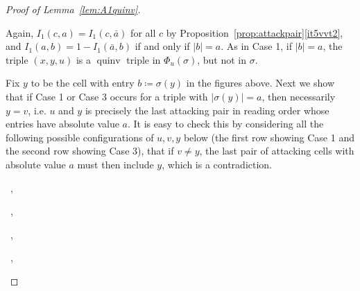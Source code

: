 \documentclass[11pt]{article}
\theoremstyle{definition}
\numberwithin{equation}{section}
\DeclareMathOperator{\quinv}{quinv}
\newcommand\cellL[4]{
\def\i{#1} \def\j{#2} \def\entry{#3} \def\labl{#4}
\draw (\j-1,-\i)--(\j,-\i)--(\j,-\i+1)--(\j-1,-\i+1)--(\j-1,-\i);
\node at (\j-.5,-\i+.5) {\entry};
\node at (\j-1.3,-\i+.8) {\tiny\labl};
}
\begin{document}
\begin{proof}[Proof of Lemma~\ref{lem:A1quinv}]
\begin{flushleft}
\end{flushleft}
Again, $I_1(c,a)=I_1(c,\bar{a})$ for all $c$ by Proposition~\ref{prop:attackpair}\ref{it5vvt2}, and $I_1(a,b)=1-I_1(\bar{a},b)$ if and only if $|b|=a$. As in Case 1, if $|b|=a$, the triple $(x,y,u)$ is a $\quinv$ triple in $\Phi_u(\sigma)$, but not in $\sigma$.

Fix $y$ to be the cell with entry $b\coloneqq\sigma(y)$ in the figures above. Next we show that if Case 1 or Case 3 occurs for a triple with $|\sigma(y)|=a$, then necessarily $y=v$, i.e. $u$ and $y$ is precisely the last attacking pair in reading order whose entries have absolute value $a$. It is easy to check this by considering all the following possible configurations of $u,v,y$ below (the first row showing Case 1 and the second row showing Case 3), that if $v\neq y$, the last pair of attacking cells with absolute value $a$ must then include $y$, which is a contradiction.

\begin{center}
\ ,
\quad
{}\ ,
\quad
{}\ ,
\quad
{}
\quad
{}\ ,
\quad
{}
\end{center}


\end{proof}
\end{document}
